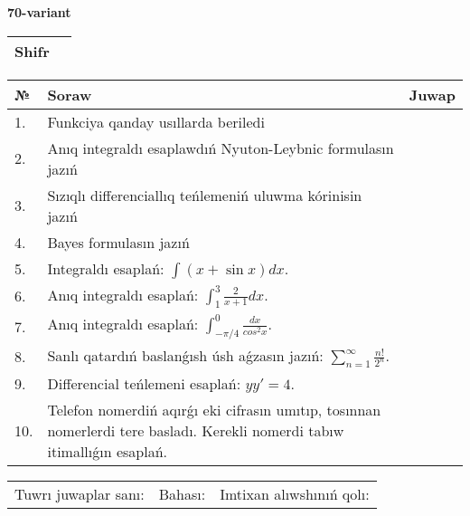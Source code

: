 \documentclass{article}
\begin{document}
  \egroup
  
  \newpage
  
  
  \textbf{70-variant}\\
  
  \bgroup
  \def\arraystretch{1.6} %
  
  \begin{tabular}{|m{5.7cm}|m{9.5cm}|}
  \hline
  Shifr & \\
  \hline
  \end{tabular}
  
  \vspace{1cm}
  
  \begin{tabular}{|m{0.7cm}|m{10cm}|m{4cm}|}
  \hline
  № & Soraw & Juwap \\
  \hline
  1. & Funkciya qanday usıllarda beriledi &  \\
  \hline
  2. & Anıq integraldı esaplawdıń Nyuton-Leybnic formulasın jazıń &  \\
  \hline
  3. & Sızıqlı differenciallıq teńlemeniń uluwma kórinisin jazıń &  \\
  \hline
  4. & Bayes formulasın jazıń &  \\
  \hline
  5. & Integraldı esaplań: \(\int{(x + \sin x)dx}\). &  \\
  \hline
  6. & Anıq integraldı esaplań: \(\int_{1}^{3}\frac{2}{x + 1}dx\). &  \\
  \hline
  7. & Anıq integraldı esaplań: \(\int_{- \pi/4}^{0}\frac{dx}{cos^2 x}\). &  \\
  \hline
  8. & Sanlı qatardıń baslanǵısh úsh aǵzasın jazıń: \(\sum_{n = 1}^{\infty}\frac{n!}{2^{n}}\). &  \\
  \hline
  9. & Differencial teńlemeni esaplań: \(yy' = 4\). &  \\
  \hline
  10. & Telefon nomerdiń aqırǵı eki cifrasın umıtıp, tosınnan nomerlerdi tere basladı. Kerekli nomerdi tabıw itimallıǵın esaplań. &  \\
  \hline
  \end{tabular}
  
  \vspace{1cm}
  
  \begin{tabular}{lll}
  Tuwrı juwaplar sanı: \underline{\hspace{1.5cm}} & 
  Bahası: \underline{\hspace{1.5cm}} & 
  Imtixan alıwshınıń qolı: \underline{\hspace{2cm}} \\
  \end{tabular}
  
\end{document}
